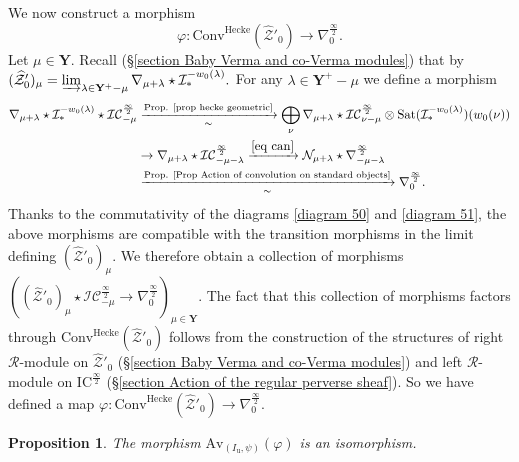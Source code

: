 \documentclass[11pt]{amsart}
\theoremstyle{plain}
\newtheorem{prop}[thm]{Proposition}
\theoremstyle{remark}
\numberwithin{equation}{section}
\begin{document}
We now construct a morphism 
\begin{equation}\label{eq morphism constandard}
  \varphi: \mathrm{Conv}^{\mathrm{Hecke}}(\widehat{\mathcal{Z}}'_0)\to\nabla^{\frac{\infty}{2}}_0. 
\end{equation}
Let $\mu\in\mathbf{Y}$. Recall (§\ref{section Baby Verma and co-Verma modules}) that by  $(\widehat{\mathcal{Z}}'_0)_\mu=\varinjlim_{\lambda\in\mathbf{Y}^+-\mu} \nabla_{\mu+\lambda}\star \mathcal{I}^{-w_0(\lambda)}_*.$ For any $\lambda\in\mathbf{Y}^+-\mu$ we define a morphism
\begin{align*}
    \nabla_{\mu+\lambda}\star \mathcal{I}^{-w_0(\lambda)}_*\star\mathcal{IC}^{\frac{\infty}{2}}_{-\mu}&\xrightarrow[\sim]{\text{Prop. \ref{prop hecke geometric}}}\bigoplus_{\nu}\nabla_{\mu+\lambda}\star\mathcal{IC}^{\frac{\infty}{2}}_{\nu-\mu}\otimes\mathrm{Sat}(\mathcal{I}^{-w_0(\lambda)}_*)(w_0(\nu)) \\
    &\to \nabla_{\mu+\lambda}\star\mathcal{IC}^{\frac{\infty}{2}}_{-\mu-\lambda}\xrightarrow{\eqref{eq can}} \mathcal{N}_{\mu+\lambda}\star\nabla^{\frac{\infty}{2}}_{-\mu-\lambda}\\
    &\xrightarrow[\sim]{\text{Prop. \ref{Prop Action of convolution on standard objects}}}\nabla^{\frac{\infty}{2}}_{0}.
\end{align*}
Thanks to the commutativity of the diagrams \eqref{diagram 50} and \eqref{diagram 51}, the above morphisms are compatible with the transition morphisms in the limit defining $(\widehat{\mathcal{Z}}'_0)_\mu$. We therefore obtain a collection of morphisms $((\widehat{\mathcal{Z}}'_0)_\mu\star\mathcal{IC}^{\frac{\infty}{2}}_{-\mu}\to \nabla^{\frac{\infty}{2}}_{0})_{\mu\in\mathbf{Y}}$. The fact that this collection of morphisms factors through $\mathrm{Conv}^{\mathrm{Hecke}}(\widehat{\mathcal{Z}}'_0)$ follows from the construction of the structures of right $\mathcal{R}$-module on $\widehat{\mathcal{Z}}'_0$ (§\ref{section Baby Verma and co-Verma modules}) and left $\mathcal{R}$-module on $\mathrm{IC}^{\frac{\infty}{2}}$ (§\ref{section Action of the regular perverse sheaf}). So we have defined a map $\varphi:\mathrm{Conv}^{\mathrm{Hecke}}(\widehat{\mathcal{Z}}'_0)\to\nabla^{\frac{\infty}{2}}_0$.
\begin{prop}\label{prop varphi iso}
    The morphism $\mathrm{Av}_{(I_\mathrm{u},\psi)}(\varphi)$ is an isomorphism.
\end{prop}
\end{document}
